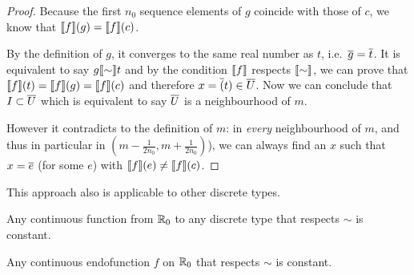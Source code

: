 \begin{proof}
Because the first $n_0$ sequence elements of $g$ coincide with those of $c$, we know that $\llbracket f\rrbracket (g) = \llbracket f\rrbracket(c)$. 

By the definition of $g$, it converges to the same real number as $t$, i.e.\ $\overline{g} = \overline{t}$. It is equivalent to say $g \llbracket \sim\rrbracket t$ and by the condition $\llbracket f\rrbracket$ respects $\llbracket \sim\rrbracket$, we can prove that $\llbracket f\rrbracket (t) = \llbracket f\rrbracket (g) = \llbracket f\rrbracket(c)$ and therefore $ x = \overline{(}t) \in \overline{U}$. Now we can conclude that $I \subset \overline{U}$ which is equivalent to say $\overline{U}$ is a neighbourhood of $m$.

However it contradicts to the definition of $m$: in
\emph{every} neighbourhood of $m$, and thus in particular in $(m - \frac 1 {2n_0} , m+ \frac 1 {2n_0})$),
we can always find an $x$ such that $x = \overline{e}$ (for some $e$) with $\llbracket f\rrbracket(e) \not= \llbracket f\rrbracket(c)$. 
\end{proof}


This approach also is applicable to other discrete types.

\begin{corollary}\label{dis:con}
Any continuous function from $\mathbb{R}_0$ to any discrete type that respects $\sim$ is constant.
\end{corollary}



\begin{theorem}
Any continuous endofunction $f$ on $\mathbb{R}_0$ that respects $\sim$ is constant.
\end{theorem}

